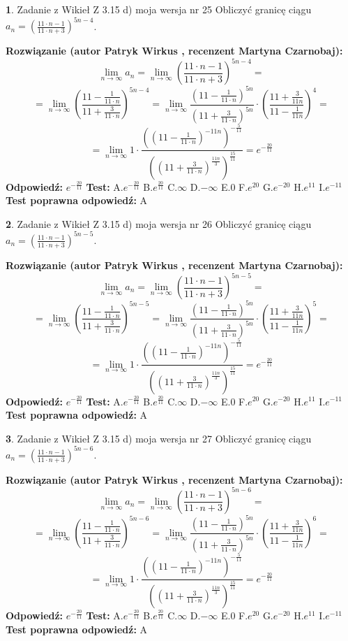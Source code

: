 \documentclass[12pt, a4paper]{article}
\theoremstyle{definition} %
\newtheorem{zad}{}
\newcommand{\zadStart}[1]{\begin{zad}#1\newline}
\newcommand{\zadStop}{\end{zad}}
\newcommand{\rozwStart}[2]{\noindent \textbf{Rozwiązanie (autor #1 , recenzent #2): }\newline}
\newcommand{\rozwStop}{\newline}
\newcommand{\odpStart}{\noindent \textbf{Odpowiedź:}\newline}
\newcommand{\odpStop}{\newline}
\newcommand{\testStart}{\noindent \textbf{Test:}\newline}
\newcommand{\testStop}{\newline}
\newcommand{\kluczStart}{\noindent \textbf{Test poprawna odpowiedź:}\newline}
\newcommand{\kluczStop}{\newline}
\begin{document}
\zadStart{Zadanie z Wikieł Z 3.15 d) moja wersja nr 25}
Obliczyć granicę ciągu $a_{n}=(\frac{11\cdot n - 1}{11 \cdot n + 3})^{5n-4}$.
\zadStop
\rozwStart{Patryk Wirkus}{Martyna Czarnobaj}
$$\lim\limits_{n\to\infty} a_{n} = \lim\limits_{n\to\infty}(\frac{11\cdot n - 1}{11 \cdot n + 3})^{5n-4}=$$
$$=\lim\limits_{n\to\infty}(\frac{11 - \frac{1}{11\cdot n}}{11 + \frac{3}{11 \cdot n}})^{5n-4}=\lim\limits_{n\to\infty}\frac{(11 - \frac{1}{11\cdot n})^{5n}}{(11 + \frac{3}{11\cdot n})^{5n}} \cdot (\frac{11+\frac{3}{11n}}{11-\frac{1}{11n}})^{4}=$$
$$=\lim\limits_{n\to\infty} 1 \cdot \frac{((11-\frac{1}{11 \cdot n})^{-11n})^{-\frac{5}{11}}}{((11+\frac{3}{11 \cdot n})^{\frac{11n}{3}})^{\frac{15}{11}}} =e^{-\frac{20}{11}}$$
\rozwStop
\odpStart
$e^{-\frac{20}{11}}$
\odpStop
\testStart
A.$ e^{-\frac{20}{11}}$
B.$ e^{\frac{20}{11}}$
C.$\infty$
D.$-\infty$
E.$0$
F.$e^{20}$
G.$e^{-20}$
H.$e^{11}$
I.$e^{-11}$
\testStop
\kluczStart
A
\kluczStop



\zadStart{Zadanie z Wikieł Z 3.15 d) moja wersja nr 26}
Obliczyć granicę ciągu $a_{n}=(\frac{11\cdot n - 1}{11 \cdot n + 3})^{5n-5}$.
\zadStop
\rozwStart{Patryk Wirkus}{Martyna Czarnobaj}
$$\lim\limits_{n\to\infty} a_{n} = \lim\limits_{n\to\infty}(\frac{11\cdot n - 1}{11 \cdot n + 3})^{5n-5}=$$
$$=\lim\limits_{n\to\infty}(\frac{11 - \frac{1}{11\cdot n}}{11 + \frac{3}{11 \cdot n}})^{5n-5}=\lim\limits_{n\to\infty}\frac{(11 - \frac{1}{11\cdot n})^{5n}}{(11 + \frac{3}{11\cdot n})^{5n}} \cdot (\frac{11+\frac{3}{11n}}{11-\frac{1}{11n}})^{5}=$$
$$=\lim\limits_{n\to\infty} 1 \cdot \frac{((11-\frac{1}{11 \cdot n})^{-11n})^{-\frac{5}{11}}}{((11+\frac{3}{11 \cdot n})^{\frac{11n}{3}})^{\frac{15}{11}}} =e^{-\frac{20}{11}}$$
\rozwStop
\odpStart
$e^{-\frac{20}{11}}$
\odpStop
\testStart
A.$ e^{-\frac{20}{11}}$
B.$ e^{\frac{20}{11}}$
C.$\infty$
D.$-\infty$
E.$0$
F.$e^{20}$
G.$e^{-20}$
H.$e^{11}$
I.$e^{-11}$
\testStop
\kluczStart
A
\kluczStop



\zadStart{Zadanie z Wikieł Z 3.15 d) moja wersja nr 27}
Obliczyć granicę ciągu $a_{n}=(\frac{11\cdot n - 1}{11 \cdot n + 3})^{5n-6}$.
\zadStop
\rozwStart{Patryk Wirkus}{Martyna Czarnobaj}
$$\lim\limits_{n\to\infty} a_{n} = \lim\limits_{n\to\infty}(\frac{11\cdot n - 1}{11 \cdot n + 3})^{5n-6}=$$
$$=\lim\limits_{n\to\infty}(\frac{11 - \frac{1}{11\cdot n}}{11 + \frac{3}{11 \cdot n}})^{5n-6}=\lim\limits_{n\to\infty}\frac{(11 - \frac{1}{11\cdot n})^{5n}}{(11 + \frac{3}{11\cdot n})^{5n}} \cdot (\frac{11+\frac{3}{11n}}{11-\frac{1}{11n}})^{6}=$$
$$=\lim\limits_{n\to\infty} 1 \cdot \frac{((11-\frac{1}{11 \cdot n})^{-11n})^{-\frac{5}{11}}}{((11+\frac{3}{11 \cdot n})^{\frac{11n}{3}})^{\frac{15}{11}}} =e^{-\frac{20}{11}}$$
\rozwStop
\odpStart
$e^{-\frac{20}{11}}$
\odpStop
\testStart
A.$ e^{-\frac{20}{11}}$
B.$ e^{\frac{20}{11}}$
C.$\infty$
D.$-\infty$
E.$0$
F.$e^{20}$
G.$e^{-20}$
H.$e^{11}$
I.$e^{-11}$
\testStop
\kluczStart
A
\kluczStop
\end{document}
